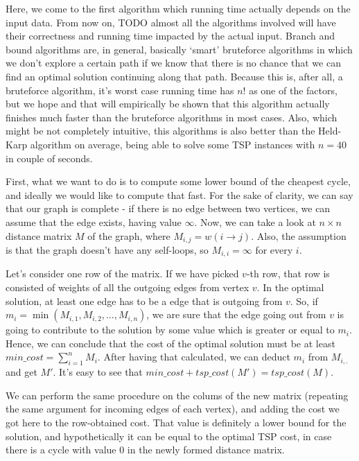 \documentclass[12pt,twoside,notitlepage]{report}
\begin{document}
Here, we come to the first algorithm which running time actually depends on the input data. From now on, TODO almost all the algorithms involved will have their correctness and running time impacted by the actual input. Branch and bound algorithms are, in general, basically `smart' bruteforce algorithms in which we don't explore a certain path if we know that there is no chance that we can find an optimal solution continuing along that path. Because this is, after all, a bruteforce algorithm, it's worst case running time has $n!$ as one of the factors, but we hope and that will empirically be shown that this algorithm actually finishes much faster than the bruteforce algorithms in most cases. Also, which might be not completely intuitive, this algorithms is also better than the Held-Karp algorithm on average, being able to solve some TSP instances with $n = 40$ in couple of seconds.

\smallskip

First, what we want to do is to compute some lower bound of the cheapest cycle, and ideally we would like to compute that fast. For the sake of clarity, we can say that our graph is complete - if there is no edge between two vertices, we can assume that the edge exists, having value $\infty$. Now, we can take a look at $n \times n$ distance matrix $M$ of the graph, where $M_{i, j} = w(i \rightarrow j)$. Also, the assumption is that the graph doesn't have any self-loops, so $M_{i, i} = \infty$ for every $i$.

\smallskip

Let's consider one row of the matrix. If we have picked $v$-th row, that row is consisted of weights of all the outgoing edges from vertex $v$. In the optimal solution, at least one edge has to be a edge that is outgoing from $v$. So, if $m_{i} = \min(M_{i, 1}, M_{i, 2}, \dots, M_{i, n})$, we are sure that the edge going out from $v$ is going to contribute to the solution by some value which is greater or equal to $m_{i}$. Hence, we can conclude that the cost of the optimal solution must be at least $min\_cost = \sum_{i = 1}^{n} M_{i}$. After having that calculated, we can deduct $m_{i}$ from $M_{i, .}$ and get $M'$. It's easy to see that $min\_cost + tsp\_cost(M') = tsp\_cost(M)$. 

\smallskip

We can perform the same procedure on the colums of the new matrix (repeating the same argument for incoming edges of each vertex), and adding the cost we got here to the row-obtained cost. That value is definitely a lower bound for the solution, and hypothetically it can be equal to the optimal TSP cost, in case there is a cycle with value 0 in the newly formed distance matrix. 
\end{document}

